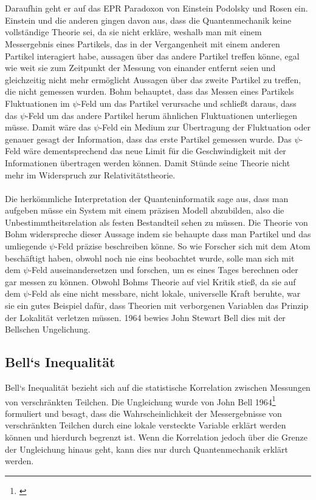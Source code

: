 \\\\
Daraufhin geht er auf das EPR Paradoxon von Einstein Podolsky und Rosen ein. Einstein und die anderen gingen davon aus, dass die Quantenmechanik keine vollständige Theorie sei, da sie nicht erkläre, weshalb man mit einem Messergebnis eines Partikels, das in der Vergangenheit mit einem anderen Partikel interagiert habe, aussagen über das andere Partikel treffen könne, egal wie weit sie zum Zeitpunkt der Messung von einander entfernt seien und gleichzeitig nicht mehr ermöglicht Aussagen über das zweite Partikel zu treffen, die nicht gemessen wurden. Bohm behauptet, dass das Messen eines Partikels Fluktuationen im $\psi$-Feld um das Partikel verursache und schließt daraus, dass das $\psi$-Feld um das andere Partikel herum ähnlichen Fluktuationen unterliegen müsse. Damit wäre das $\psi$-Feld ein Medium zur Übertragung der Fluktuation oder genauer gesagt der Information, dass das erste Partikel gemessen wurde. Das $\psi$-Feld wäre dementsprechend das neue Limit für die Geschwindigkeit mit der Informationen übertragen werden können. Damit Stünde seine Theorie nicht mehr im Widerspruch zur Relativitätstheorie.\\\\
Die herkömmliche Interpretation der Quanteninformatik sage aus, dass man aufgeben müsse ein System mit einem präzisen Modell abzubilden, also die Unbestimmtheitsrelation als festen Bestandteil sehen zu müssen. Die Theorie von Bohm widerspreche dieser Aussage indem sie behaupte dass man Partikel und das umliegende $\psi$-Feld präzise beschreiben könne. So wie Forscher sich mit dem Atom beschäftigt haben, obwohl noch nie eins beobachtet wurde, solle man sich mit dem $\psi$-Feld auseinandersetzen und forschen, um es eines Tages berechnen oder gar messen zu können.
Obwohl Bohms Theorie auf viel Kritik stieß, da sie auf dem $\psi$-Feld als eine nicht messbare, nicht lokale, universelle Kraft beruhte, war sie ein gutes Beispiel dafür, dass Theorien mit verborgenen Variablen das Prinzip der Lokalität verletzen müssen. 1964 bewies John Stewart Bell dies mit der Bellschen Ungelichung.


\subsection{Bell`s Inequalität}
\label{subsec:bells_inequality}
Bell`s Inequalität bezieht sich auf die statistische Korrelation zwischen Messungen von verschränkten Teilchen.
Die Ungleichung wurde von John Bell 1964\footnote{\cite{bell_einstein_1964}} formuliert und besagt, dass die Wahrscheinlichkeit der Messergebnisse von verschränkten Teilchen durch eine lokale versteckte Variable erklärt werden können und hierdurch begrenzt ist.
Wenn die Korrelation jedoch über die Grenze der Ungleichung hinaus geht, kann dies nur durch Quantenmechanik erklärt werden.\\

